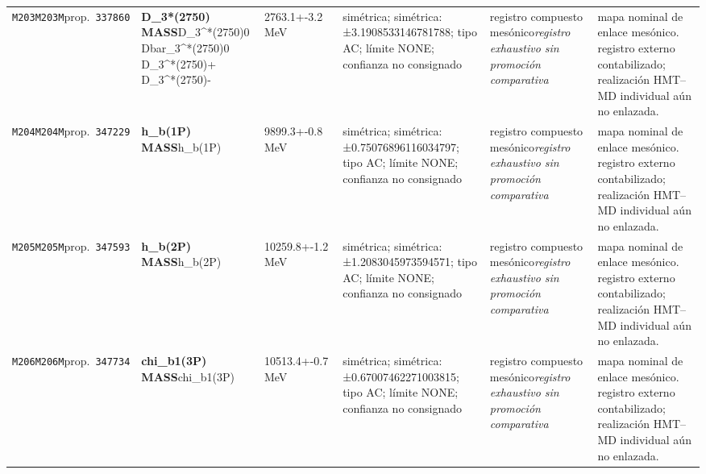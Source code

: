 \begin{landscape}
\begin{longtable}{L{1.85cm}L{4.45cm}L{2.35cm}L{4.05cm}L{3.35cm}L{7.15cm}}
\texttt{M203}\newline \texttt{M203M}\newline prop.\ \texttt{337860} & \textbf{D\_\allowbreak{}3*(2750) MASS}\newline D\_\allowbreak{}3\textasciicircum{}*(2750)0 \textbar{}\allowbreak{} Dbar\_\allowbreak{}3\textasciicircum{}*(2750)0 \textbar{}\allowbreak{} D\_\allowbreak{}3\textasciicircum{}*(2750)+ \textbar{}\allowbreak{} D\_\allowbreak{}3\textasciicircum{}*(2750)- & 2763.1+-3.2\,MeV & simétrica; simétrica: ±3.1908533146781788; tipo AC; límite NONE; confianza no consignado & registro compuesto mesónico\newline \emph{registro exhaustivo sin promoción comparativa} & mapa nominal de enlace mesónico. registro externo contabilizado; realización HMT--MD individual aún no enlazada. \\
\texttt{M204}\newline \texttt{M204M}\newline prop.\ \texttt{347229} & \textbf{h\_\allowbreak{}b(1P) MASS}\newline h\_\allowbreak{}b(1P) & 9899.3+-0.8\,MeV & simétrica; simétrica: ±0.75076896116034797; tipo AC; límite NONE; confianza no consignado & registro compuesto mesónico\newline \emph{registro exhaustivo sin promoción comparativa} & mapa nominal de enlace mesónico. registro externo contabilizado; realización HMT--MD individual aún no enlazada. \\
\texttt{M205}\newline \texttt{M205M}\newline prop.\ \texttt{347593} & \textbf{h\_\allowbreak{}b(2P) MASS}\newline h\_\allowbreak{}b(2P) & 10259.8+-1.2\,MeV & simétrica; simétrica: ±1.2083045973594571; tipo AC; límite NONE; confianza no consignado & registro compuesto mesónico\newline \emph{registro exhaustivo sin promoción comparativa} & mapa nominal de enlace mesónico. registro externo contabilizado; realización HMT--MD individual aún no enlazada. \\
\texttt{M206}\newline \texttt{M206M}\newline prop.\ \texttt{347734} & \textbf{chi\_\allowbreak{}b1(3P) MASS}\newline chi\_\allowbreak{}b1(3P) & 10513.4+-0.7\,MeV & simétrica; simétrica: ±0.67007462271003815; tipo AC; límite NONE; confianza no consignado & registro compuesto mesónico\newline \emph{registro exhaustivo sin promoción comparativa} & mapa nominal de enlace mesónico. registro externo contabilizado; realización HMT--MD individual aún no enlazada. \\

\end{longtable}
\end{landscape}
